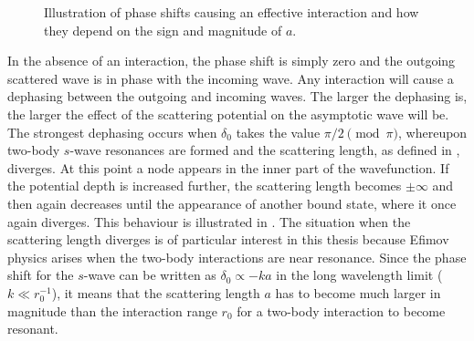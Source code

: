 \begin{figure}[h!]
	\centering
	\hfill %
	\caption{Illustration of phase shifts causing an effective interaction and how they depend on the sign and magnitude of $a$.}\label{fig:phaseshift}
\end{figure}

In the absence of an interaction, the phase shift is simply zero and the outgoing scattered wave is in phase with the incoming wave. Any interaction will cause a dephasing between the outgoing and incoming waves. The larger the dephasing is, the larger the effect of the scattering potential on the asymptotic wave will be. The strongest dephasing occurs when $\delta_0$ takes the value $\pi/2 \pmod{\pi}$, whereupon two-body $s$-wave resonances are formed and the scattering length, as defined in , diverges. At this point a node appears in the inner part of the wavefunction. If the potential depth is increased further, the scattering length becomes $\pm \infty$ and then again decreases until the appearance of another bound state, where it once again diverges. This behaviour is illustrated in . The situation when the scattering length diverges is of particular interest in this thesis because Efimov physics arises when the two-body interactions are near resonance. Since the phase shift for the $s$-wave can be written as $\delta_0 \propto -ka$ in the long wavelength limit ($k \ll r_0^{-1}$), it means that the scattering length $a$ has to become much larger in magnitude than the interaction range $r_0$ for a two-body interaction to become resonant.

